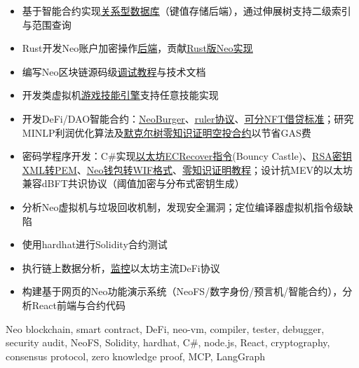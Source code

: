 \begin{experiences}
{\begin{itemize}
                        \item 基于智能合约实现\href{https://github.com/Hecate2/RelationalDB}{\underline{关系型数据库}}（键值存储后端），通过伸展树支持二级索引与范围查询
                        \item Rust开发Neo账户加密操作\href{https://github.com/Hecate2/oauth-account-backend}{\underline{后端}}，贡献\href{https://github.com/r3e-network/NeoRust}{\underline{Rust版Neo实现}}
                        \item 编写Neo区块链源码级\href{https://github.com/Hecate2/how-to-debug-neo/}{\underline{调试教程}}与技术文档
                        \item 开发类虚拟机\href{https://github.com/Hecate2/SukaLambda}{\underline{游戏技能引擎}}支持任意技能实现
                        \item 开发DeFi/DAO智能合约：\href{https://github.com/neoburger/}{\underline{NeoBurger}}、\href{https://github.com/Hecate2/neo-ruler/}{\underline{ruler协议}}、\href{https://github.com/Hecate2/NFTLoan}{\underline{可分NFT借贷标准}}；研究MINLP利润优化算法及\href{https://github.com/Hecate2/MerkleTreeForAirDrop}{\underline{默克尔树零知识证明空投合约}}以节省GAS费
                        \item 密码学程序开发：C\#实现\href{https://github.com/Hecate2/ECrecover}{\underline{以太坊ECRecover指令}}(Bouncy Castle)、\href{https://github.com/Hecate2/RSA-xml-to-pem}{\underline{RSA密钥XML转PEM}}、\href{https://github.com/Hecate2/nep2wif}{\underline{Neo钱包转WIF格式}}、\href{https://github.com/Hecate2/zk-principle}{\underline{零知识证明教程}}；设计抗MEV的以太坊兼容dBFT共识协议（阈值加密与分布式密钥生成）
                        \item 分析Neo虚拟机与垃圾回收机制，发现安全漏洞；定位编译器虚拟机指令级缺陷
                        \item 使用hardhat进行Solidity合约测试
                        \item 执行链上数据分析，\href{https://github.com/Hecate2/eth_rpc_monitor/}{\underline{监控}}以太坊主流DeFi协议
                        \item 构建基于网页的Neo功能演示系统（NeoFS/数字身份/预言机/智能合约），分析React前端与合约代码
                      \end{itemize}
                    }
                    {Neo blockchain, smart contract, DeFi, neo-vm, compiler, tester, debugger, security audit, NeoFS, Solidity, hardhat, C\#, node.js, React, cryptography, consensus protocol, zero knowledge proof, MCP, LangGraph}
  \emptySeparator

\end{experiences}
